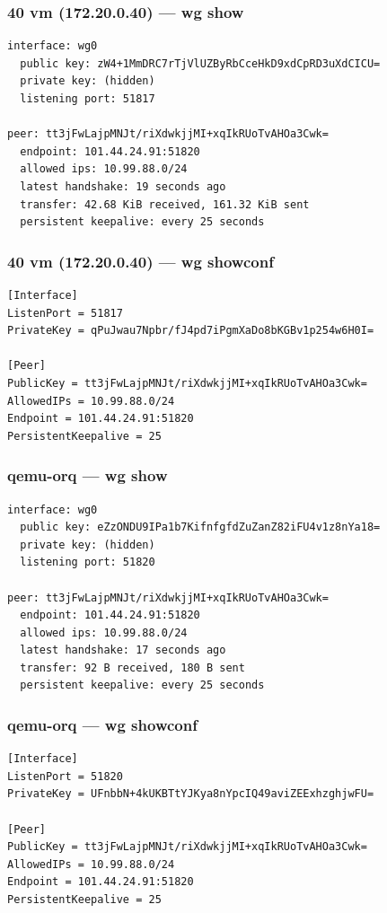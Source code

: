 \documentclass[11pt,a4paper]{article}
\begin{document}
\subsubsection*{40 vm (172.20.0.40) — wg show}
\begin{lstlisting}
interface: wg0
  public key: zW4+1MmDRC7rTjVlUZByRbCceHkD9xdCpRD3uXdCICU=
  private key: (hidden)
  listening port: 51817

peer: tt3jFwLajpMNJt/riXdwkjjMI+xqIkRUoTvAHOa3Cwk=
  endpoint: 101.44.24.91:51820
  allowed ips: 10.99.88.0/24
  latest handshake: 19 seconds ago
  transfer: 42.68 KiB received, 161.32 KiB sent
  persistent keepalive: every 25 seconds

\end{lstlisting}

\subsubsection*{40 vm (172.20.0.40) — wg showconf}
\begin{lstlisting}
[Interface]
ListenPort = 51817
PrivateKey = qPuJwau7Npbr/fJ4pd7iPgmXaDo8bKGBv1p254w6H0I=

[Peer]
PublicKey = tt3jFwLajpMNJt/riXdwkjjMI+xqIkRUoTvAHOa3Cwk=
AllowedIPs = 10.99.88.0/24
Endpoint = 101.44.24.91:51820
PersistentKeepalive = 25

\end{lstlisting}

\subsubsection*{qemu-orq — wg show}
\begin{lstlisting}
interface: wg0
  public key: eZzONDU9IPa1b7KifnfgfdZuZanZ82iFU4v1z8nYa18=
  private key: (hidden)
  listening port: 51820

peer: tt3jFwLajpMNJt/riXdwkjjMI+xqIkRUoTvAHOa3Cwk=
  endpoint: 101.44.24.91:51820
  allowed ips: 10.99.88.0/24
  latest handshake: 17 seconds ago
  transfer: 92 B received, 180 B sent
  persistent keepalive: every 25 seconds

\end{lstlisting}

\subsubsection*{qemu-orq — wg showconf}
\begin{lstlisting}
[Interface]
ListenPort = 51820
PrivateKey = UFnbbN+4kUKBTtYJKya8nYpcIQ49aviZEExhzghjwFU=

[Peer]
PublicKey = tt3jFwLajpMNJt/riXdwkjjMI+xqIkRUoTvAHOa3Cwk=
AllowedIPs = 10.99.88.0/24
Endpoint = 101.44.24.91:51820
PersistentKeepalive = 25

\end{lstlisting}
\end{document}
